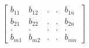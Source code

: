\documentclass[preview]{standalone}
\begin{document}
\begin{align*}
\begin{bmatrix} {b}_{11} & {b}_{12} & . & . & {b}_{1n} \\ {b}_{21} & {b}_{22} & . & . & {b}_{2n} \\ . & . & . & . & . \\ {b}_{m1} & {b}_{m2} & . & . & {b}_{mn}\end{bmatrix}
\end{align*}
\end{document}
